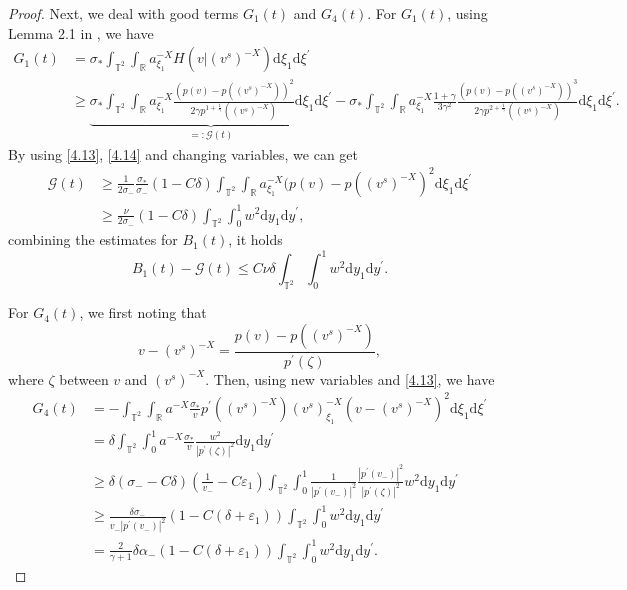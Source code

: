 \documentclass[10pt,reqno]{amsart}
\numberwithin{equation}{section}
\newcommand{\dif}{\mathrm{d}}
\begin{document}
\begin{proof}
Next, we deal with good terms $G_1(t)$ and $G_4(t)$. For $G_1(t)$, using Lemma 2.1 in \cite{WY}, we have
\begin{equation}\label{g111}
\begin{aligned}
G_1(t)&=\sigma_\ast\int_{\mathbb{T}^2}\int_{\mathbb{R}}a^{-X}_{\xi_1} H(v|(v^s)^{-X})\dif \xi_1\dif \xi^{\prime}\\
&\ge \underbrace{\sigma_\ast\int_{\mathbb{T}^2}\int_{\mathbb{R}}a^{-X}_{\xi_1} \frac{(p(v)-p((v^s)^{-X}))^2}{2\gamma p^{1+\frac{1}{\gamma}}((v^s)^{-X})}\dif \xi_1\dif \xi^{\prime}}\limits_{=:\mathcal{G}(t)}
-\sigma_\ast\int_{\mathbb{T}^2}\int_{\mathbb{R}}a^{-X}_{\xi_1} \frac{1+\gamma}{3\gamma^2} \frac{(p(v)-p((v^s)^{-X}))^3}{2\gamma p^{2+\frac{1}{\gamma}}((v^s)^{-X})}\dif \xi_1\dif \xi^{\prime}.
\end{aligned}
\end{equation}
By using \eqref{4.13}, \eqref{4.14} and changing variables, we can get
\begin{align*}
\mathcal{G}(t)&\ge \frac{1}{2\sigma_-}\frac{\sigma_\ast}{\sigma_-}(1-C\delta)\int_{\mathbb{T}^2}\int_{\mathbb{R}}a^{-X}_{\xi_1} (p(v)-p((v^s)^{-X})^2\dif \xi_1\dif \xi^{\prime}\\
&\ge \frac{\nu}{2\sigma_-}(1-C\delta)\int_{\mathbb{T}^2}\int_0^1w^2\dif y_1\dif y^{\prime},
\end{align*}
combining the estimates for $B_1(t)$, it holds
\begin{equation}\label{bg1}
B_1(t)-\mathcal{G}(t)\le C\nu\delta\int_{\mathbb{T}^2}\int_0^1w^2\dif y_1\dif y^{\prime}.
\end{equation}

For $G_4(t)$, we first noting that
\[
v-(v^s)^{-X}=\frac{p(v)-p((v^s)^{-X})}{p^{\prime}(\zeta)},
\]
where $\zeta$ between $v$ and $(v^s)^{-X}$.
Then, using new variables and \eqref{4.13}, we have
\begin{equation}\label{g4}
\begin{aligned}
G_4(t)&=-\int_{\mathbb{T}^2}\int_{\mathbb{R}}a^{-X}\frac{\sigma_\ast}{v}p^{\prime}((v^s)^{-X})(v^s)^{-X}_{\xi_1}(v-(v^s)^{-X})^2\dif \xi_1\dif \xi^{\prime}\\
&=\delta\int_{\mathbb{T}^2}\int_0^1a^{-X}\frac{\sigma_\ast}{v}\frac{w^2}{|p^{\prime}(\zeta)|^2}\dif y_1\dif y^{\prime}\\
&\ge \delta(\sigma_--C\delta)(\frac{1}{v_-}-C\varepsilon_1)
\int_{\mathbb{T}^2}\int_0^1\frac{1}{|p^{\prime}(v_-)|^2}\frac{|p^{\prime}(v_-)|^2}{|p^{\prime}(\zeta)|^2}w^2\dif y_1\dif y^{\prime}\\
&\ge \frac{\delta\sigma_-}{v_-|p^{\prime}(v_-)|^2}(1-C(\delta+\varepsilon_1))\int_{\mathbb{T}^2}
\int_0^1w^2\dif y_1\dif y^{\prime}\\
&=\frac{2}{\gamma+1}\delta\alpha_-(1-C(\delta+\varepsilon_1))\int_{\mathbb{T}^2}
\int_0^1w^2\dif y_1\dif y^{\prime}.
\end{aligned}
\end{equation}


\end{proof}
\end{document}

